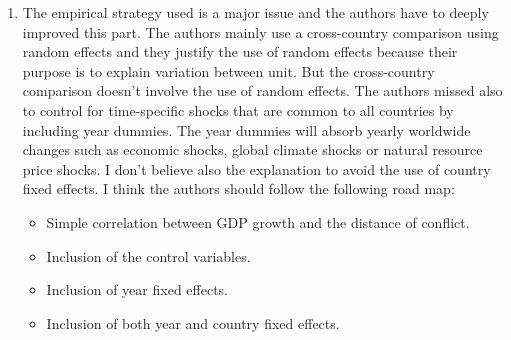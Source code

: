 \begin{enumerate}
\item The empirical strategy used is a major issue and the authors have to deeply improved this part. The authors mainly use a cross-country comparison using random effects and they justify the use of random effects because their purpose is to explain variation between unit. But the cross-country comparison doesn’t involve the use of random effects. The authors missed also to control for time-specific shocks that are common to all countries by including year dummies. The year dummies will absorb yearly worldwide changes such as economic shocks, global climate shocks or natural resource price shocks. I don’t believe also the explanation to avoid the use of country fixed effects. I think the authors should follow the following road map:
\begin{itemize}
\item Simple correlation between GDP growth and the distance of conflict.
\item Inclusion of the control variables.
\item Inclusion of year fixed effects.
\item Inclusion of both year and country fixed effects.
\end{itemize}


\end{enumerate}
